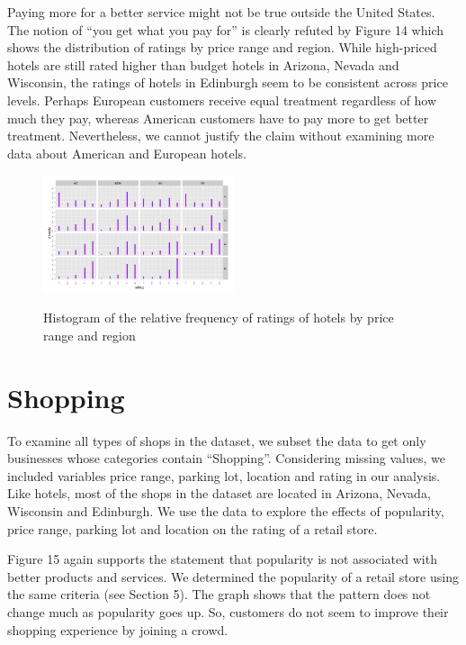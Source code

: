 \documentclass[11pt]{article}
\begin{document}
Paying more for a better service might not be true outside the United States. The notion of “you get what you pay for” is clearly refuted by Figure 14 which shows the distribution of ratings by price range and region. While high-priced hotels are still rated higher than budget hotels in Arizona, Nevada and Wisconsin, the ratings of hotels in Edinburgh seem to be consistent across price levels. Perhaps European customers receive equal treatment regardless of how much they pay, whereas American customers have to pay more to get better treatment. Nevertheless, we cannot justify the claim without examining more data about American and European hotels.

\begin{figure}[h!]
           \caption{Histogram of the relative frequency of ratings of hotels by price range and region}
	\centering
	\includegraphics[width=0.5\textwidth]{Figures/hotels3.jpeg}
           \label{hotels3}
\end{figure}

\section{Shopping}

To examine all types of shops in the dataset, we subset the data to get only businesses whose categories contain “Shopping”. Considering missing values, we included variables price range, parking lot, location and rating in our analysis. Like hotels, most of the shops in the dataset are located in Arizona, Nevada, Wisconsin and Edinburgh. We use the data to explore the effects of popularity, price range, parking lot and location on the rating of a retail store.

Figure 15 again supports the statement that popularity is not associated with better products and services. We determined the popularity of a retail store using the same criteria (see Section 5). The graph shows that the pattern does not change much as popularity goes up. So, customers do not seem to improve their shopping experience by joining a crowd.
\end{document}
